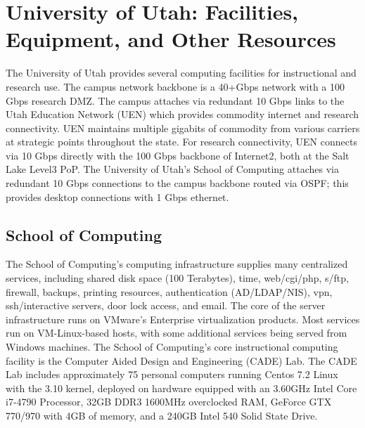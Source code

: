 
\section*{University of Utah: Facilities, Equipment, and Other Resources}

The University of Utah provides several computing facilities for instructional and research use. The campus network backbone is a 40+Gbps network with a 100 Gbps research DMZ. The campus attaches via redundant 10 Gbps links to the Utah Education Network (UEN) which provides commodity internet and research connectivity. UEN maintains multiple gigabits of commodity from various carriers at strategic points throughout the state. For research connectivity, UEN connects via 10 Gbps directly with the 100 Gbps backbone of Internet2, both at the Salt Lake Level3 PoP. The University of Utah’s School of Computing attaches via redundant 10 Gbps connections to the campus backbone routed via OSPF; this provides desktop connections with 1 Gbps ethernet.

\subsection*{School of Computing}
The School of Computing’s computing infrastructure supplies many centralized services, including shared disk space (100 Terabytes), time, web/cgi/php, s/ftp, firewall, backups, printing resources, authentication (AD/LDAP/NIS), vpn, ssh/interactive servers, door lock access, and email. The core of the server infrastructure runs on VMware’s Enterprise virtualization products. Most services run on VM-Linux-based hosts, with some additional services being served from Windows machines. The School of Computing’s core instructional computing facility is the Computer Aided Design and Engineering (CADE) Lab. The CADE Lab includes approximately 75 personal computers running Centos 7.2 Linux with the 3.10 kernel, deployed on hardware equipped with an 3.60GHz Intel Core i7-4790 Processor, 32GB DDR3 1600MHz overclocked RAM, GeForce GTX 770/970 with 4GB of memory, and a 240GB Intel 540 Solid State Drive.

